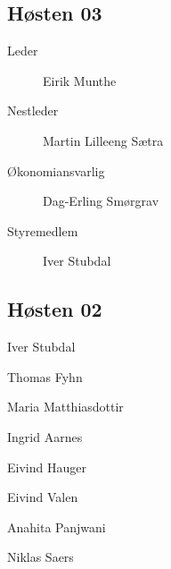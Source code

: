 {\begin{minipage}{0.6\textwidth}
\subsection*{Høsten 03}

\begin{description}
	\item[Leder] Eirik Munthe
	\item[Nestleder] Martin Lilleeng Sætra
	\item[Økonomiansvarlig] Dag-Erling Smørgrav
	\item[Styremedlem] Iver Stubdal
\end{description}
\subsection*{Høsten 02}

\begin{description}
	\item[Leder] Iver Stubdal
	\item[Nestleder] Thomas Fyhn
	\item[Funkansvarlig] Maria Matthiasdottir
	\item Ingrid Aarnes
	\item[Bedriftsansvarlig] Eivind Hauger
	\item Eivind Valen
	\item Anahita Panjwani
	\item Niklas Saers
\end{description}
\end{minipage}
}



